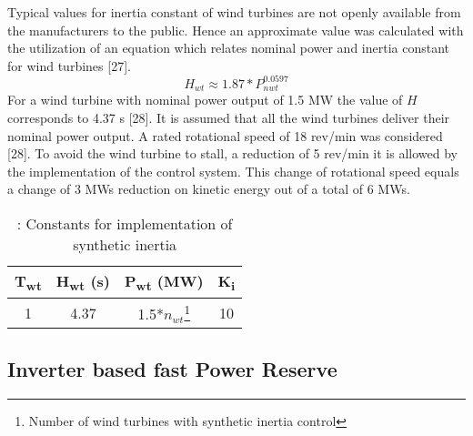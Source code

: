 

Typical values for inertia constant of wind turbines are not openly available from the manufacturers to the public. Hence an approximate value was calculated with the utilization of an equation which relates nominal power and inertia constant for wind turbines [27].
\begin{equation}
	\label{eq:wtinertia}
	H_{wt}\approx1.87*P_{nwt}^{0.0597}
\end{equation}
For a wind turbine with nominal power output of 1.5 MW the value of $ H $ corresponds to 4.37 s [28].
It is assumed that all the wind turbines deliver their nominal power output. A rated rotational speed of 18 rev/min was considered [28]. To avoid the wind turbine to stall, a reduction of 5 rev/min it is allowed by the implementation of the control system. This change of rotational speed equals a change of 3 MWs reduction on kinetic energy out of a total of 6 MWs.

\begin{table}[h]
	\caption{\label{tb:inertia}: Constants for implementation of synthetic inertia}
	\centering
	\begin{tabular}{cccc}
		\toprule
		\textbf{T\textsubscript{wt}} 	& \textbf{ H\textsubscript{wt} (s)}	& \textbf{ P\textsubscript{wt} (MW)}  & \textbf{ K\textsubscript{i}} \\
		\midrule
			1	       & 4.37		        &  1.5*$ n_{wt} $\footnote{Number of wind turbines with synthetic inertia control} & 10 \\
		\bottomrule
	\end{tabular}
\end{table}

\subsection{Inverter based fast Power Reserve}



